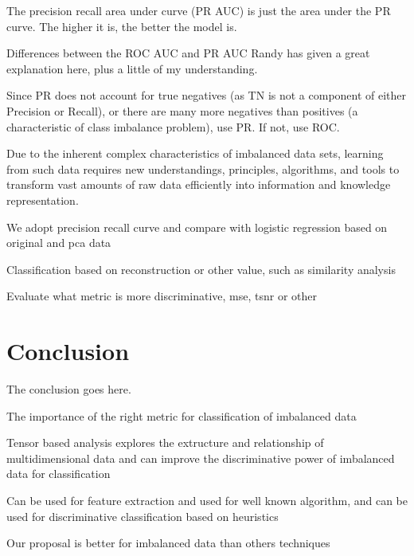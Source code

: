 The precision recall area under curve (PR AUC) is just the area under the PR curve. The higher it is, the better the model is.

Differences between the ROC AUC and PR AUC
Randy has given a great explanation here, plus a little of my understanding.

Since PR does not account for true negatives (as TN is not a component of either Precision or Recall), or there are many more negatives than positives (a characteristic of class imbalance problem), use PR. If not, use ROC.

Due to the inherent complex characteristics of imbalanced data sets, learning from such data requires new understandings, principles, algorithms, and tools to transform vast amounts of raw data efficiently into information and knowledge representation.

We adopt precision recall curve and compare with logistic regression based on original and pca data

Classification based on reconstruction or other value, such as similarity analysis

Evaluate what metric is more discriminative, mse, tsnr or other


\section{Conclusion}
\label{sec:4_conclusion}

The conclusion goes here.

The importance of the right metric for classification of imbalanced data

Tensor based analysis explores the extructure and relationship of multidimensional data and can improve the discriminative power of imbalanced data for classification

Can be used for feature extraction and used for well known algorithm,  and can be used for discriminative classification based on heuristics

Our proposal is better for imbalanced data than others techniques